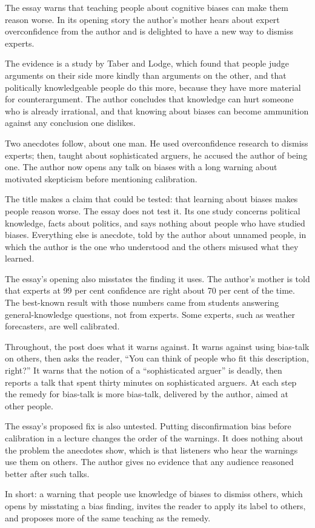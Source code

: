\begin{afterword}
\summaryhead

The essay warns that teaching people about cognitive biases can make them reason worse. In its opening story the author's mother hears about expert overconfidence from the author and is delighted to have a new way to dismiss experts.

The evidence is a study by Taber and Lodge, which found that people judge arguments on their side more kindly than arguments on the other, and that politically knowledgeable people do this more, because they have more material for counterargument. The author concludes that knowledge can hurt someone who is already irrational, and that knowing about biases can become ammunition against any conclusion one dislikes.

Two anecdotes follow, about one man. He used overconfidence research to dismiss experts; then, taught about sophisticated arguers, he accused the author of being one. The author now opens any talk on biases with a long warning about motivated skepticism before mentioning calibration.

\responsehead

The title makes a claim that could be tested: that learning about biases makes people reason worse. The essay does not test it. Its one study concerns political knowledge, facts about politics, and says nothing about people who have studied biases. Everything else is anecdote, told by the author about unnamed people, in which the author is the one who understood and the others misused what they learned.

The essay's opening also misstates the finding it uses. The author's mother is told that experts at 99 per cent confidence are right about 70 per cent of the time. The best-known result with those numbers came from students answering general-knowledge questions, not from experts. Some experts, such as weather forecasters, are well calibrated.

Throughout, the post does what it warns against. It warns against using bias-talk on others, then asks the reader, ``You can think of people who fit this description, right?'' It warns that the notion of a ``sophisticated arguer'' is deadly, then reports a talk that spent thirty minutes on sophisticated arguers. At each step the remedy for bias-talk is more bias-talk, delivered by the author, aimed at other people.

The essay's proposed fix is also untested. Putting disconfirmation bias before calibration in a lecture changes the order of the warnings. It does nothing about the problem the anecdotes show, which is that listeners who hear the warnings use them on others. The author gives no evidence that any audience reasoned better after such talks.

In short: a warning that people use knowledge of biases to dismiss others, which opens by misstating a bias finding, invites the reader to apply its label to others, and proposes more of the same teaching as the remedy.
\end{afterword}
